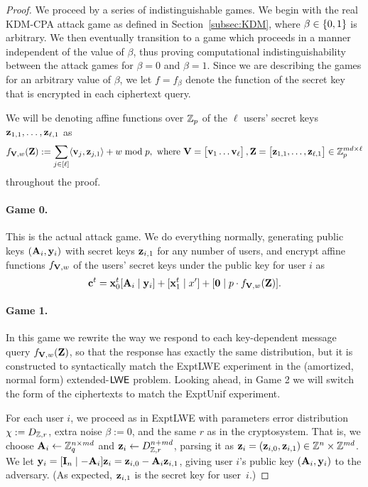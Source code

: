 \begin{proof}
  We proceed by a series of indistinguishable games. We begin with the
  real KDM-CPA attack game as defined in Section~\ref{subsec:KDM},
  where $\beta \in \{{0,1}\}$ is arbitrary. We then eventually transition
  to a game which proceeds in a manner independent of the value of
  $\beta$, thus proving computational indistinguishability between the
  attack games for $\beta=0$ and $\beta=1$.  Since we are describing
  the games for an arbitrary value of $\beta$, we let $f=f_{\beta}$
  denote the function of the secret key that is encrypted in each
  ciphertext query.

  We will be denoting affine functions over $\mathbb{Z}_p$ of the $\ell$
  users' secret keys $\mathbf{z}_{1,1}, \ldots, \mathbf{z}_{\ell,1}$ as
  \[f_{\mathbf{V}, w}(\mathbf{Z}) := \sum_{j \in [\ell]} \langle{\ensuremath{\mathbf{v}}_j, \ensuremath{\mathbf{z}}_{j,1}}\rangle+w
  \bmod p, \text{ where } \mathbf{V} = \begin{bmatrix}\mathbf{v}_1 \ldots
    \mathbf{v}_{\ell}\end{bmatrix}, \mathbf{Z} = \begin{bmatrix}\mathbf{z}_{1,1}, 
    \ldots, \mathbf{z}_{\ell,1}\end{bmatrix} \in \mathbb{Z}_p^{md \times \ell}\] throughout
  the proof.

  \paragraph{Game 0.} \label{KDMCPAAttackGame} This is the actual
  attack game. We do everything normally, generating public keys
  $(\mathbf{A}_{i}, \mathbf{y}_{i})$ with secret keys $\mathbf{z}_{i,1}$ for any
  number of users, and encrypt affine functions $f_{\mathbf{V},w}$ of the
  users' secret keys under the public key for user $i$ as
  \[\mathbf{c}^t =\mathbf{x}_{0}^t[\mathbf{A}_i \mid \mathbf{y}_i] + [\mathbf{x}_1^t \mid x']
  + [\mathbf{0} \mid p\cdot f_{\mathbf{V}, w}(\mathbf{Z})].\]

  \paragraph{Game 1.} \label{KDMCPAasLWE} In this game we rewrite the
  way we respond to each key-dependent message query $f_{\mathbf{V},w}(\mathbf{Z})$, so
  that the response has exactly the same distribution, but it is
  constructed to syntactically match the \textsf{ExptLWE} experiment
  in the (amortized, normal form) extended-$\mathsf{LWE}$ problem.  Looking
  ahead, in Game 2 we will switch the form of the ciphertexts to match
  the \textsf{ExptUnif} experiment.

  For each user $i$, we proceed as in \textsf{ExptLWE} with parameters
  error distribution $\chi:=D_{\mathbb{Z},r}$, extra noise $\beta:=0$, and the
  same $r$ as in the cryptosystem.  That is, we choose $\mathbf{A}_{i}
  \gets \mathbb{Z}_q^{n \times md}$ and $\mathbf{z}_{i} \gets D_{\mathbb{Z}, r}^{n+md}$,
  parsing it as $\mathbf{z}_{i}=(\mathbf{z}_{i,0},\mathbf{z}_{i,1}) \in \mathbb{Z}^{n} \times
  \mathbb{Z}^{md}$.  We let $\mathbf{y}_{i} = [\mathbf{I}_{n} \mid -\mathbf{A}_{i}] \mathbf{z}_{i}
  = \mathbf{z}_{i,0}-\mathbf{A}_{i} \mathbf{z}_{i,1}$, giving user $i$'s public key
  $(\mathbf{A}_{i}, \mathbf{y}_{i})$ to the adversary.  (As expected,
  $\mathbf{z}_{i,1}$ is the secret key for user~$i$.)


\end{proof}
